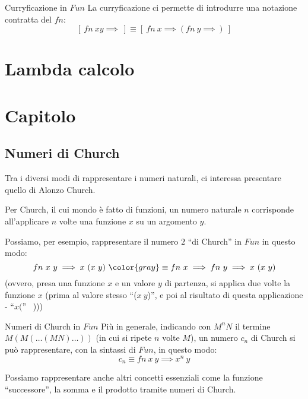 \documentclass[a4paper,11pt]{report}
\begin{document}
\begin{gbox}{Curryficazione in \( Fun \)}
    La curryficazione ci permette di introdurre una notazione contratta del \( fn \):
    \[ [ \ fn \ x y \implies \ ] \equiv [ \ fn \ x \implies ( fn \ y \implies ) \ ]\]

\end{gbox}

\chapter{Lambda calcolo}
\chapter{Capitolo}
\section{Numeri di Church}
Tra i diversi modi di rappresentare i numeri naturali, ci interessa presentare quello di Alonzo Church.

Per Church, il cui mondo è fatto di funzioni, un numero naturale \( n \) corrisponde all'applicare \( n \) volte una funzione \( x \) su un argomento \( y \).
 
Possiamo, per esempio, rappresentare il numero \( 2 \) ``di Church'' in \( Fun \) in questo modo:
\[ fn \  x \ y \implies x \ (x \ y) \ {\color{gray} \equiv fn \ x \implies fn \ y \implies x \ (x \ y) }\]
    (ovvero, presa una funzione \( x \) e un valore \( y \) di partenza, si applica due volte la funzione \( x \) (prima al valore stesso ``(\( x \ y \))'', e poi al risultato di questa applicazione - ``\( x( \)'' \ )))

\begin{defbox}{Numeri di Church in \( Fun \)}{}
    Più in generale, indicando con \( M^n N \) il termine \( M(M(\dots(MN)\dots)) \) {\small\color{gray}(in cui si ripete \( n \) volte \( M \))}, un numero \(c_n\) di Church si può rappresentare, con la sintassi di \( Fun \), in questo modo:
    \[ c_n \equiv fn \ x \ y \implies x^n \ y \]
\end{defbox}

Possiamo rappresentare anche altri concetti essenziali come la funzione ``successore'', la somma e il prodotto tramite numeri di Church.
\end{document}
